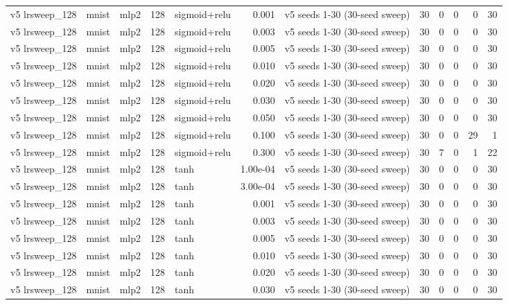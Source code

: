 \begin{table}[htbp]
{\begin{tabular}{@{}lllrlrlrrrrr@{}}
v5 lrsweep\_128 & mnist & mlp2 & 128 & sigmoid+relu & 0.001 & v5 seeds 1-30 (30-seed sweep) & 30 & 0 & 0 & 0 & 30 \\
v5 lrsweep\_128 & mnist & mlp2 & 128 & sigmoid+relu & 0.003 & v5 seeds 1-30 (30-seed sweep) & 30 & 0 & 0 & 0 & 30 \\
v5 lrsweep\_128 & mnist & mlp2 & 128 & sigmoid+relu & 0.005 & v5 seeds 1-30 (30-seed sweep) & 30 & 0 & 0 & 0 & 30 \\
v5 lrsweep\_128 & mnist & mlp2 & 128 & sigmoid+relu & 0.010 & v5 seeds 1-30 (30-seed sweep) & 30 & 0 & 0 & 0 & 30 \\
v5 lrsweep\_128 & mnist & mlp2 & 128 & sigmoid+relu & 0.020 & v5 seeds 1-30 (30-seed sweep) & 30 & 0 & 0 & 0 & 30 \\
v5 lrsweep\_128 & mnist & mlp2 & 128 & sigmoid+relu & 0.030 & v5 seeds 1-30 (30-seed sweep) & 30 & 0 & 0 & 0 & 30 \\
v5 lrsweep\_128 & mnist & mlp2 & 128 & sigmoid+relu & 0.050 & v5 seeds 1-30 (30-seed sweep) & 30 & 0 & 0 & 0 & 30 \\
v5 lrsweep\_128 & mnist & mlp2 & 128 & sigmoid+relu & 0.100 & v5 seeds 1-30 (30-seed sweep) & 30 & 0 & 0 & 29 & 1 \\
v5 lrsweep\_128 & mnist & mlp2 & 128 & sigmoid+relu & 0.300 & v5 seeds 1-30 (30-seed sweep) & 30 & 7 & 0 & 1 & 22 \\
v5 lrsweep\_128 & mnist & mlp2 & 128 & tanh & 1.00e-04 & v5 seeds 1-30 (30-seed sweep) & 30 & 0 & 0 & 0 & 30 \\
v5 lrsweep\_128 & mnist & mlp2 & 128 & tanh & 3.00e-04 & v5 seeds 1-30 (30-seed sweep) & 30 & 0 & 0 & 0 & 30 \\
v5 lrsweep\_128 & mnist & mlp2 & 128 & tanh & 0.001 & v5 seeds 1-30 (30-seed sweep) & 30 & 0 & 0 & 0 & 30 \\
v5 lrsweep\_128 & mnist & mlp2 & 128 & tanh & 0.003 & v5 seeds 1-30 (30-seed sweep) & 30 & 0 & 0 & 0 & 30 \\
v5 lrsweep\_128 & mnist & mlp2 & 128 & tanh & 0.005 & v5 seeds 1-30 (30-seed sweep) & 30 & 0 & 0 & 0 & 30 \\
v5 lrsweep\_128 & mnist & mlp2 & 128 & tanh & 0.010 & v5 seeds 1-30 (30-seed sweep) & 30 & 0 & 0 & 0 & 30 \\
v5 lrsweep\_128 & mnist & mlp2 & 128 & tanh & 0.020 & v5 seeds 1-30 (30-seed sweep) & 30 & 0 & 0 & 0 & 30 \\
v5 lrsweep\_128 & mnist & mlp2 & 128 & tanh & 0.030 & v5 seeds 1-30 (30-seed sweep) & 30 & 0 & 0 & 0 & 30 \\

\end{tabular}}
\end{table}
